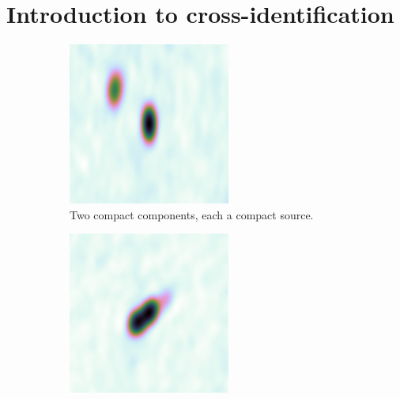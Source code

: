 \section{Introduction to cross-identification}
\label{sec:atlas-xid-intro-cross-id}

    \begin{figure}
        \centering
        \begin{subfigure}{0.3\textwidth}
            \includegraphics[width=\textwidth]{atlas-images/cdfs_100_compact.png}
            \caption{Two compact components, each a compact source.}
        \end{subfigure}
        \begin{subfigure}{0.3\textwidth}
            \includegraphics[width=\textwidth]{atlas-images/elais_57_resolved.png}

\end{subfigure}
\end{figure}
